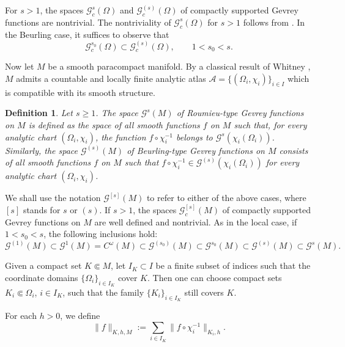 \documentclass[11pt,reqno]{amsart}
\numberwithin{equation}{section}
\newtheorem{definition}[theorem]{Definition}
\begin{document}
	For $s>1$, the spaces $\mathscr{G}_c^{s}(\Omega)$ and $\mathscr{G}_c^{(s)}(\Omega)$ of compactly supported Gevrey functions are nontrivial. The nontriviality of $\mathscr{G}_c^{s}(\Omega)$ for $s>1$ follows from \cite[Example~1.4.9]{Rod_Gevrey}. In the Beurling case, it suffices to observe that
	\[
	\mathscr{G}_c^{s_0}(\Omega)\subset \mathscr{G}_c^{(s)}(\Omega),
	\qquad 1<s_0<s.
	\]
	
	Now let $M$ be a smooth paracompact manifold. By a classical result of Whitney \cite{Whitney}, $M$ admits a countable and locally finite analytic atlas $
	\mathscr{A} = \{(\Omega_i,\chi_i)\}_{i\in I}$ which is compatible with its smooth structure.
	
	\begin{definition}
		Let $s\geq 1$. The space $\mathscr{G}^s(M)$ of Roumieu-type Gevrey functions on $M$ is defined as the space of all smooth functions $f$ on $M$ such that, for every analytic chart $(\Omega_i,\chi_i)$, the function $f\circ\chi_i^{-1}$ belongs to $\mathscr{G}^s(\chi_i(\Omega_i))$. Similarly, the space $\mathscr{G}^{(s)}(M)$ of Beurling-type Gevrey functions on $M$ consists of all smooth functions $f$ on $M$ such that $f\circ\chi_i^{-1}\in \mathscr{G}^{(s)}(\chi_i(\Omega_i))$ for every analytic chart $(\Omega_i,\chi_i)$.
	\end{definition}
	
	We shall use the notation $\mathscr{G}^{[s]}(M)$ to refer to either of the above cases, where ${[s]}$ stands for $s$ or $(s)$. If $s>1$, the spaces $\mathscr{G}_c^{[s]}(M)$ of compactly supported Gevrey functions on $M$ are well defined and nontrivial. As in the local case, if $1<s_0<s$, the following inclusions hold:
	\begin{equation}\label{inc_gev}
		\mathscr{G}^{(1)}(M)\subset
		\mathscr{G}^1(M)=C^\omega(M)\subset
		\mathscr{G}^{(s_0)}(M)\subset
		\mathscr{G}^{s_0}(M)\subset
		\mathscr{G}^{(s)}(M)\subset
		\mathscr{G}^s(M).
	\end{equation}
	
	Given a compact set $K \Subset M$, let $I_K \subset I$ be a finite subset of indices such that the coordinate domains $\{\Omega_i\}_{i\in I_K}$ cover $K$. Then one can choose compact sets $K_i \Subset \Omega_i$, $i\in I_K$, such that the family $\{K_i\}_{i\in I_K}$ still covers $K$.
	
	For each $h>0$, we define
	\begin{equation*}
		\|f\|_{K,h,M} := \sum_{i\in I_K} \|f\circ\chi_i^{-1}\|_{K_i,h}.
	\end{equation*}
	
\end{document}
